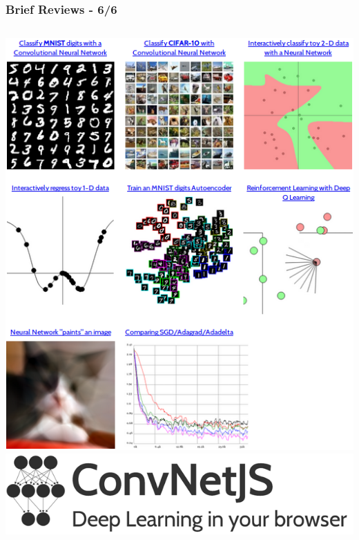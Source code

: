\documentclass[hyperref={pdfpagelabels=false}]{beamer}
\begin{document}
     \begin{frame}
       \frametitle{Brief Reviews - 6/6}

       \begin{columns}
         \includegraphics[scale=0.33]{convnetjs_demos.png}
         \centering
       \includegraphics[scale=0.23]{logo_convnetjs.png}


\end{columns}
\end{frame}
\end{document}
